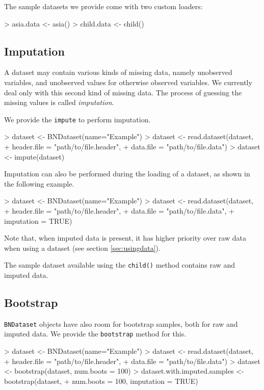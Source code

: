 \documentclass{article}
\newcommand{\Robject}[1]{{\texttt{#1}}}
\newcommand{\Rmethod}[1]{{\texttt{#1}}}
\begin{document}
The sample datasets we provide come with two custom loaders:
\begin{Schunk}
\begin{Sinput}
> asia.data  <- asia()
> child.data <- child()
\end{Sinput}
\end{Schunk}

\subsection{Imputation}
A dataset may contain various kinds of missing data, namely unobserved variables,
and unobserved values for otherwise observed variables. We currently deal only with this
second kind of missing data. The process of guessing the missing values is called \emph{imputation}.

We provide the \Rmethod{impute} to perform imputation.
\begin{Schunk}
\begin{Sinput}
> dataset <- BNDataset(name="Example")
> dataset <- read.dataset(dataset,
+                         header.file = "path/to/file.header",
+                         data.file   = "path/to/file.data")
> dataset <- impute(dataset)
\end{Sinput}
\end{Schunk}

Imputation can also be performed during the loading of a dataset, as shown in the following example.
\begin{Schunk}
\begin{Sinput}
> dataset <- BNDataset(name="Example")
> dataset <- read.dataset(dataset,
+                         header.file = "path/to/file.header",
+                         data.file   = "path/to/file.data",
+                         imputation  = TRUE)
\end{Sinput}
\end{Schunk}

Note that, when imputed data is present, it has higher priority over raw data when using a dataset
(see section \ref{sec:usingdata}).

The sample dataset available using the \Rmethod{child()} method contains raw and imputed data.

\subsection{Bootstrap}
\Robject{BNDataset} objects have also room for bootstrap samples, both for raw and imputed data.
We provide the \Rmethod{bootstrap} method for this.
\begin{Schunk}
\begin{Sinput}
> dataset <- BNDataset(name="Example")
> dataset <- read.dataset(dataset,
+                         header.file = "path/to/file.header",
+                         data.file   = "path/to/file.data")
> dataset <- bootstrap(dataset, num.boots = 100)
> dataset.with.imputed.samples <- bootstrap(dataset,
+                             num.boots = 100, imputation = TRUE)
\end{Sinput}
\end{Schunk}
\end{document}

